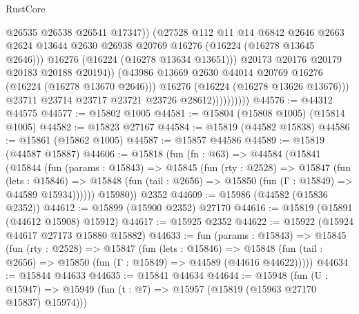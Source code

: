 \begin{lexlean}{RustCore}
\begin{coremodule}
                                    @26535
                                    @26538
                                    @26541
                                    @17347))
                                (@27528
                                  @112
                                  @11
                                  @14
                                  @6842
                                  @2646
                                  @2663
                                  @2624
                                  @13644
                                  @2630
                                  @26938
                                  @20769
                                  @16276
                                  (@16224 (@16278 @13645 @2646)))
                                @16276
                                (@16224 (@16278 @13634 @13651)))
                              @20173
                              @20176
                              @20179
                              @20183
                              @20188
                              @20194))
                          (@43986 @13669 @2630 @44014 @20769 @16276 (@16224 (@16278 @13670 @2646)))
                          @16276
                          (@16224 (@16278 @13626 @13676)))
                        @23711
                        @23714
                        @23717
                        @23721
                        @23726
                        @28612))))))))))
@44576 := @44312 @44575
@44577 := @15802 @1005
@44581 := @15804 (@15808 @1005) (@15814 @1005)
@44582 := @15823 @27167
@44584 := @15819 (@44582 @15838)
@44586 := @15861 (@15862 @1005)
@44587 := @15857 @44586
@44589 := @15819 (@44587 @15887)
@44606 := @15818
    (fun (fn : @63) =>
    @44584
      (@15841
        (@15844
          (fun (params : @15843) =>
          @15845
            (fun (rty : @2528) =>
            @15847
              (fun (lets : @15846) =>
              @15848 (fun (tail : @2656) => @15850 (fun (Γ : @15849) => @44589 @15934))))))
        @15980))
    @2352
@44609 := @15986 (@44582 (@15836 @2352))
@44612 := @15899 (@15900 @2352) @27170
@44616 := @15819 (@15891 (@44612 @15908) @15912)
@44617 := @15925 @2352
@44622 := @15922 (@15924 @44617 @27173 @15880 @15882)
@44633 := fun (params : @15843) =>
  @15845
    (fun (rty : @2528) =>
    @15847
      (fun (lets : @15846) =>
      @15848 (fun (tail : @2656) => @15850 (fun (Γ : @15849) => @44589 (@44616 @44622)))))
@44634 := @15844 @44633
@44635 := @15841 @44634
@44644 := @15948
    (fun (U : @15947) => @15949 (fun (t : @7) => @15957 (@15819 (@15963 @27170 @15837) @15974)))

\end{coremodule}
\end{lexlean}
